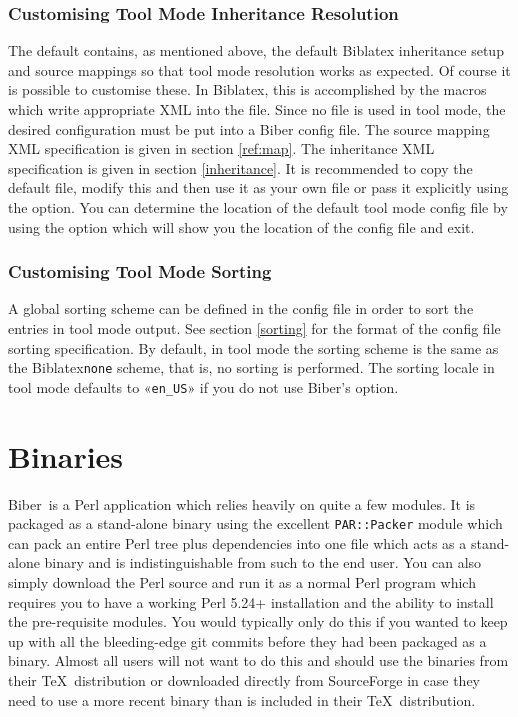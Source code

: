 \documentclass{ltxdockit}
\newcommand*{\biber}{Biber\xspace}
\newcommand*{\biblatex}{Biblatex\xspace}
\begin{document}
\subsubsection{Customising Tool Mode Inheritance Resolution}
The default  contains, as mentioned above, the
default \biblatex {} inheritance setup and \bibtex source
mappings so that tool mode resolution works as expected. Of course it is
possible to customise these. In \biblatex, this is accomplished by the
 macros which write appropriate XML into the
 file. Since no  file is used in tool mode, the
desired configuration must be put into a \biber config file. The source
mapping XML specification is given in section \ref{ref:map}. The inheritance
XML specification is given in section \ref{inheritance}. It is recommended
to copy the default  file, modify this and then use
it as your own  file or pass it explicitly using the
 option. You can determine the location of the default
tool mode config file by using the  option which will
show you the location of the config file and exit.

\subsubsection{Customising Tool Mode Sorting}
A global sorting scheme can be defined in the config file in order to sort
the entries in tool mode output. See section \ref{sorting} for the format
of the config file sorting specification. By default, in tool mode the
sorting scheme is the same as the \biblatex \texttt{none} scheme, that is,
no sorting is performed. The sorting locale in tool mode defaults to
«\texttt{en\_US}» if you do not use \biber's  option.
\bigskip%
\section{Binaries}\label{binaries}

\biber\ is a Perl application which relies heavily on quite a few
modules. It is packaged as a stand-alone binary using the excellent
\verb+PAR::Packer+ module which can pack an entire Perl tree plus
dependencies into one file which acts as a stand-alone binary and is
indistinguishable from such to the end user. You can also simply download
the Perl source and run it as a normal Perl program which
requires you to have a working Perl 5.24+ installation and the
ability to install the pre-requisite modules. You would typically only do
this if you wanted to keep up with all the bleeding-edge git commits before
they had been packaged as a binary. Almost all users will not want to do
this and should use the binaries from their \TeX\ distribution or downloaded
directly from SourceForge in case they need to use a more recent binary
than is included in their \TeX\ distribution.
\end{document}
